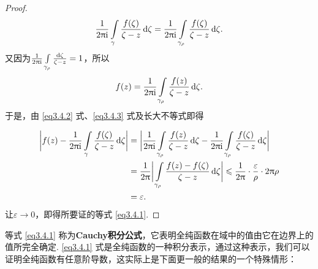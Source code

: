 \begin{proof}
  \noindent\begin{minipage}{0.7\textwidth}
    \begin{equation}\label{eq3.4.2}
      \frac1{2\uppi\mathrm i}\int\limits_\gamma\frac{f(\zeta)}{\zeta-z}\mathop{}\!\mathrm{d} \zeta
      = \frac1{2\uppi\mathrm i}\int\limits_{\gamma_\rho}\frac{f(\zeta)}{\zeta-z}\mathop{}\!\mathrm{d} \zeta.
    \end{equation}
    又因为$\frac1{2\uppi\mathrm i}\int\limits_{\gamma_\rho}\frac{\mathop{}\!\mathrm{d} \zeta}{\zeta-z}=1$，所以
    \begin{equation}\label{eq3.4.3}
      f(z) = \frac1{2\uppi\mathrm i}\int\limits_{\gamma_\rho}\frac{f(z)}{\zeta-z}\mathop{}\!\mathrm{d} \zeta.
    \end{equation}
    于是，由 \eqref{eq3.4.2} 式、\eqref{eq3.4.3} 式及长大不等式即得
  \end{minipage}
  \begin{minipage}{0.3\textwidth}
    \centering
  \end{minipage}
  \begin{align*}
    \bigg|f(z)-\frac1{2\uppi\mathrm i}\int\limits_\gamma\frac{f(\zeta)}{\zeta-z}\mathop{}\!\mathrm{d} \zeta\bigg|
    & = \bigg|\frac1{2\uppi\mathrm i}\int\limits_{\gamma_\rho}\frac{f(z)}{\zeta-z}\mathop{}\!\mathrm{d} \zeta-\frac1{2\uppi\mathrm i}\int\limits_{\gamma_\rho}\frac{f(\zeta)}{\zeta-z}\mathop{}\!\mathrm{d} \zeta\bigg|\\
    & = \frac1{2\uppi}\bigg|\int\limits_{\gamma_\rho}\frac{f(z)-f(\zeta)}{\zeta-z}\mathop{}\!\mathrm{d} \zeta\bigg|\leqslant\frac1{2\uppi}\cdot\frac{\varepsilon}\rho\cdot2\uppi\rho\\
    & = \varepsilon.
  \end{align*}
  让$\varepsilon\to0$，即得所要证的等式 \eqref{eq3.4.1}.
\end{proof}

等式 \eqref{eq3.4.1} 称为\textbf{Cauchy积分公式}，它表明全纯函数在域中的值由它在边界上的值所完全确定. \eqref{eq3.4.1} 式是全纯函数的一种积分表示，通过这种表示，我们可以证明全纯函数有任意阶导数，这实际上是下面更一般的结果的一个特殊情形：

